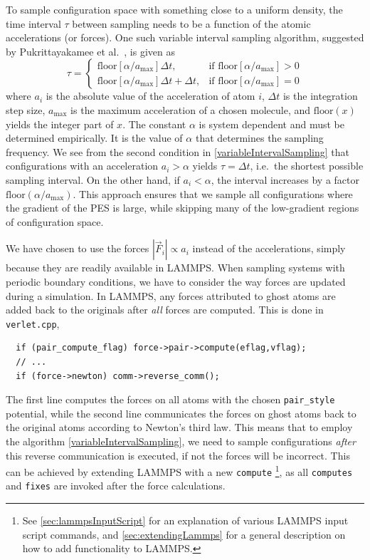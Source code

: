 \documentclass[twoside,english]{uiofysmaster}
\begin{document}
To sample configuration space with something close to a uniform density, the time interval $\tau$ between 
sampling needs to be a function of the atomic accelerations (or forces). One such variable 
interval sampling algorithm, suggested by Pukrittayakamee et al.\ \cite{Pukrittayakamee09}, is given as
\begin{equation}
 \tau = 
\begin{cases}
\textrm{floor}\left[\alpha/a_{\textrm{max}}\right]\Delta t, 
&\textrm{if floor}\left[\alpha/a_{\textrm{max}}\right] > 0 \\
\textrm{floor}\left[\alpha/a_{\textrm{max}}\right]\Delta t + \Delta t, 
&\textrm{if floor}\left[\alpha/a_{\textrm{max}}\right] = 0
\end{cases}
\label{variableIntervalSampling}
\end{equation}
where $a_i$ is the absolute value of the acceleration of atom $i$, $\Delta t$ is the integration step size, 
$a_\textrm{max}$ is the maximum acceleration of a chosen molecule, and $\textrm{floor}(x)$ yields
the integer part of $x$. The constant $\alpha$ is system dependent and must be determined empirically. It is the value 
of $\alpha$ that determines the sampling frequency. We see from the second condition in \eqref{variableIntervalSampling} that
configurations with an acceleration $a_i > \alpha$ yields $\tau = \Delta t$, i.e.\ the shortest possible sampling
interval. On the other hand, if $a_i < \alpha$, the interval increases by a factor $\textrm{floor}(\alpha/a_\textrm{max})$. 
This approach ensures that we sample all configurations where the gradient of the PES is large, while skipping many
of the low-gradient regions of configuration space. 

We have chosen to use the forces $|\vec{F}_i| \propto a_i$ instead of the accelerations, simply because they are
readily available in LAMMPS. When sampling systems with periodic boundary conditions, we have to consider 
the way forces are updated during a simulation. In LAMMPS, any forces attributed to ghost atoms are added back 
to the originals after \textit{all} forces are computed. This is done in
\texttt{verlet.cpp},
 \begin{verbatim}
  if (pair_compute_flag) force->pair->compute(eflag,vflag);
  // ...
  if (force->newton) comm->reverse_comm();
 \end{verbatim}
The first line computes the forces on all atoms with the chosen \texttt{pair\_style} potential, while
the second line communicates the forces on ghost atoms back to the original atoms according to Newton's third law. 
This means that to employ the algorithm
\eqref{variableIntervalSampling}, we need to sample configurations \textit{after} this reverse communication is
executed, if not the forces will be incorrect. This can be achieved by extending LAMMPS with a new \texttt{compute}%
\footnote{See \autoref{sec:lammpsInputScript} for an explanation of various LAMMPS input script commands, 
and \autoref{sec:extendingLammps} for a general description on how to add functionality to LAMMPS.},
as all \texttt{computes} and \texttt{fixes} are invoked after the
force calculations. 
\end{document}
